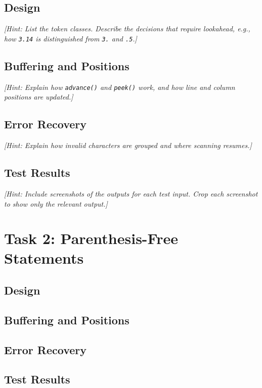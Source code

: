 \documentclass[manuscript,oneside,10pt]{acmart}
\newcommand{\hint}[1]{{\small\itshape [Hint: #1]}}
\begin{document}
\subsection{Design}
\hint{List the token classes. Describe the decisions that require
lookahead, e.g., how \texttt{3.14} is distinguished from
\texttt{3.} and \texttt{.5}.}

\subsection{Buffering and Positions}
\hint{Explain how \texttt{advance()} and \texttt{peek()} work,
and how line and column positions are updated.}

\subsection{Error Recovery}
\hint{Explain how invalid characters are grouped and where scanning
resumes.}

\subsection{Test Results}
\hint{Include screenshots of the outputs for each test input.
Crop each screenshot to show only the relevant output.}

\section{Task 2: Parenthesis-Free Statements}

\subsection{Design}

\subsection{Buffering and Positions}

\subsection{Error Recovery}

\subsection{Test Results}
\end{document}
